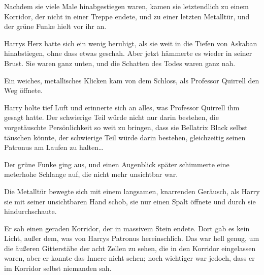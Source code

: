\later

Nachdem sie viele Male hinabgestiegen waren, kamen sie letztendlich zu einem Korridor, der nicht in einer Treppe endete, und zu einer letzten Metalltür, und der grüne Funke hielt vor ihr an.

Harrys Herz hatte sich ein wenig beruhigt, als sie weit in die Tiefen von Askaban hinabstiegen, ohne dass etwas geschah. Aber jetzt hämmerte es wieder in seiner Brust. Sie waren ganz unten, und die Schatten des Todes waren ganz nah.

Ein weiches, metallisches Klicken kam von dem Schloss, als Professor Quirrell den Weg öffnete.

Harry holte tief Luft und erinnerte sich an alles, was Professor Quirrell ihm gesagt hatte. Der schwierige Teil würde nicht nur darin bestehen, die vorgetäuschte Persönlichkeit so weit zu bringen, dass sie Bellatrix Black selbst täuschen könnte, der schwierige Teil würde darin bestehen, gleichzeitig seinen Patronus am Laufen zu halten…

Der grüne Funke ging aus, und einen Augenblick später schimmerte eine meterhohe Schlange auf, die nicht mehr unsichtbar war.

Die Metalltür bewegte sich mit einem langsamen, knarrenden Geräusch, als Harry sie mit seiner unsichtbaren Hand schob, sie nur einen Spalt öffnete und durch sie hindurchschaute.

Er sah einen geraden Korridor, der in massivem Stein endete. Dort gab es kein Licht, außer dem, was von Harrys Patronus hereinschlich. Das war hell genug, um die äußeren Gitterstäbe der acht Zellen zu sehen, die in den Korridor eingelassen waren, aber er konnte das Innere nicht sehen; noch wichtiger war jedoch, dass er im Korridor selbst niemanden sah.

